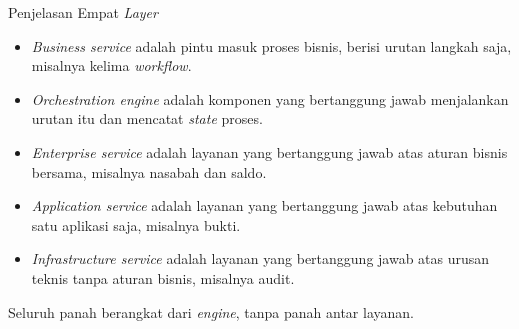 \documentclass[aspectratio=169, table, 12pt]{beamer}
\begin{document}
\begin{frame}{{\Large Penjelasan Empat \textit{Layer}}}
  \vspace{10pt}
  \begin{itemize}\small
    \item \textit{Business service} adalah pintu masuk proses bisnis, berisi
          urutan langkah saja, misalnya kelima \textit{workflow}.
    \item \textit{Orchestration engine} adalah komponen yang bertanggung jawab
          menjalankan urutan itu dan mencatat \textit{state} proses.
    \item \textit{Enterprise service} adalah layanan yang bertanggung jawab atas
          aturan bisnis bersama, misalnya nasabah dan saldo.
    \item \textit{Application service} adalah layanan yang bertanggung jawab atas
          kebutuhan satu aplikasi saja, misalnya bukti.
    \item \textit{Infrastructure service} adalah layanan yang bertanggung jawab
          atas urusan teknis tanpa aturan bisnis, misalnya audit.
  \end{itemize}

  \vspace{6pt}
  {\small Seluruh panah berangkat dari \textit{engine}, tanpa panah antar
  layanan.}
\end{frame}
\end{document}
